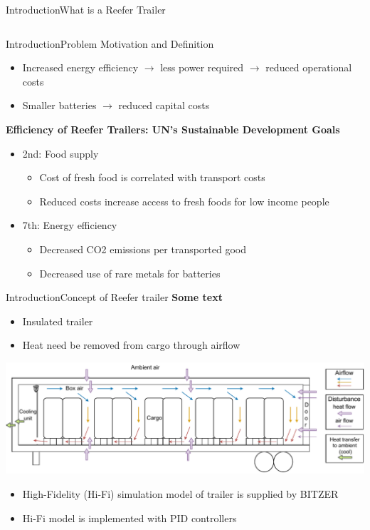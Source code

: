 \begin{frame}{Introduction}{What is a Reefer Trailer}
\begin{columns}
\begin{column}{.5\textwidth}
 		\end{column}
 	\end{columns}	
\end{frame}


\begin{frame}{Introduction}{Problem Motivation and Definition}
	\begin{itemize}
		\item Increased energy efficiency $\rightarrow$ less power required $\rightarrow$ reduced operational costs  
		\item Smaller batteries $\rightarrow$ reduced capital costs		
	\end{itemize}
	\textbf{Efficiency of Reefer Trailers: UN's Sustainable Development Goals}
	\begin{itemize}	
		\item 2nd: Food supply
		\begin{itemize}
			\item Cost of fresh food is correlated with transport costs
			\item Reduced costs increase access to fresh foods for low income people		
		\end{itemize}
		\item 7th: Energy efficiency
		\begin{itemize}
			\item Decreased CO2 emissions per transported good
			\item Decreased use of rare metals for batteries	
		\end{itemize}
	\end{itemize}	
\end{frame}

\begin{frame}{Introduction}{Concept of Reefer trailer}
	\textbf{Some text}
	\begin{itemize}
		\item Insulated trailer
		\item Heat need be removed from cargo through airflow	
	\end{itemize}
	\includegraphics[width=1\textwidth]{../Graphics/Trailer_airflow.pdf}
	\begin{itemize}
		\item High-Fidelity (Hi-Fi) simulation model of trailer is supplied by BITZER
		\item Hi-Fi model is implemented with PID controllers
	\end{itemize}
\end{frame}

